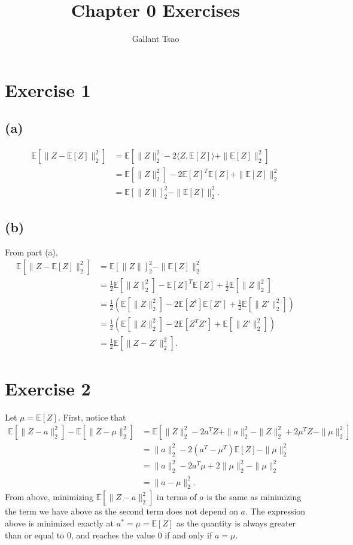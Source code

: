 \documentclass{article}
\title{Chapter 0 Exercises}
\author{Gallant Tsao}
\date{}
\begin{document}
\maketitle


\section*{Exercise 1}
\subsection*{(a)}
\begin{align*}
	\mathbb{E}[\|Z - \mathbb{E}[Z]\|_2^2] 
	&= \mathbb{E}[\|Z\|_2^2 - 2 \langle Z, \mathbb{E}[Z] \rangle + \|\mathbb{E}[Z]\|_2^2] \\
	&= \mathbb{E}[\|Z\|_2^2] - 2 \mathbb{E}[Z]^T \mathbb{E}[Z] + \|\mathbb{E}[Z]\|_2^2 \\
	&= \mathbb{E}[\|Z\|]_2^2 - \|\mathbb{E}[Z]\|_2^2.
\end{align*}

\subsection*{(b)}
From part (a), 
\begin{align*}
	\mathbb{E}[\|Z - \mathbb{E}[Z]\|_2^2] 
	&= \mathbb{E}[\|Z\|]_2^2 - \|\mathbb{E}[Z]\|_2^2 \\
	&= \frac{1}{2}\mathbb{E}[\|Z\|_2^2] - \mathbb{E}[Z]^T \mathbb{E}[Z] + \frac{1}{2}\mathbb{E}[\|Z\|_2^2] \\
	&= \frac{1}{2} (\mathbb{E}[\|Z\|_2^2] - 2 \mathbb{E}[Z^t]\mathbb{E}[Z'] 
	+ \frac{1}{2}\mathbb{E}[\|Z'\|_2^2]) \\
	&= \frac{1}{2} (\mathbb{E}[\|Z\|_2^2] - 2 \mathbb{E}[Z^T Z'] + \mathbb{E}[\|Z'\|_2^2]) \\
	&= \frac{1}{2}\mathbb{E}[\|Z - Z'\|_2^2].
\end{align*}


\newpage
\section*{Exercise 2}
Let $\mu = \mathbb{E}[Z]$. First, notice that 
\begin{align*}
	\mathbb{E}[\|Z - a\|_2^2] - \mathbb{E}[\|Z - \mu\|_2^2] 
	&= \mathbb{E}[\|Z\|_2^2 - 2a^T Z + \|a\|_2^2 - \|Z\|_2^2 + 2 \mu^T Z - \|\mu\|_2^2] \\
	&= \|a\|_2^2 - 2(a^T - \mu^T)\mathbb{E}[Z] - \|\mu\|_2^2 \\
	&= \|a\|_2^2 - 2a^T \mu + 2\|\mu\|_2^2 - \|\mu\|_2^2 \\
	&= \|a - \mu\|_2^2.
\end{align*}
From above, minimizing $\mathbb{E}[\|Z - a\|_2^2]$ in terms of $a$ is the same as minimizing the term 
we have above as the second term does not depend on $a$. The expression above is minimized exactly at 
$a^* = \mu = \mathbb{E}[Z]$ as the quantity is always greater than or equal to 0, and reaches the value 
$0$ if and only if $a = \mu$.
\end{document}
